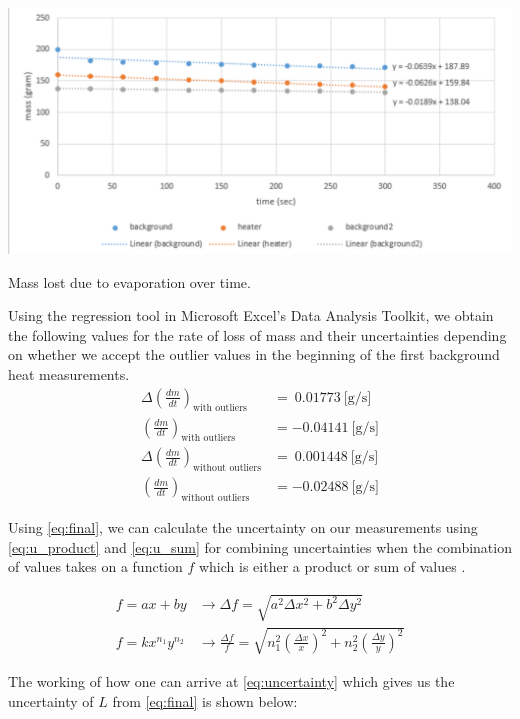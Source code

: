 \documentclass{article}
\begin{document}
\begin{graph}[H]
  \includegraphics[width=\textwidth]{./img/graph.pdf}
  \caption{Mass lost due to evaporation over time.}
  \label{graph:mass}
\end{graph}

Using the regression tool in Microsoft Excel's Data Analysis Toolkit, we obtain the following values for the rate of loss of mass and their uncertainties depending on whether we accept the outlier values in the beginning of the first background heat measurements.
\begin{align*}
  \Delta \left( \frac{dm}{dt} \right)_{\text{with outliers}} &=  ~0.01773 ~\text{[g/s]}\\
  \left( \frac{dm}{dt} \right)_{\text{with outliers}} &= -0.04141 ~\text{[g/s]}\\
  \Delta \left( \frac{dm}{dt} \right)_{\text{without outliers}} &= ~0.001448 ~\text{[g/s]}\\
  \left( \frac{dm}{dt} \right)_{\text{without outliers}} &= -0.02488 ~\text{[g/s]}
\end{align*}

Using \eqref{eq:final}, we can calculate the uncertainty on our measurements using \eqref{eq:u_product} and \eqref{eq:u_sum}  for combining uncertainties when the combination of values takes on a function $f$ which is either a product or sum of values \autocite{Palmer}.

\begin{align}
  \label{eq:u_product} f = ax + by &\to \Delta f = \sqrt{a^2\Delta x^2 + b^2 \Delta y^2}\\
  \label{eq:u_sum} f = kx^{n_1}y^{n_2} &\to \frac{\Delta f}{f} = \sqrt{n_1^2 \left( \frac{\Delta x}{x} \right)^2 + n_2^2 \left( \frac{\Delta y}{y} \right)^2}
\end{align}

The working of how one can arrive at \eqref{eq:uncertainty} which gives us the uncertainty of $L$ from \eqref{eq:final} is shown below:
\end{document}
